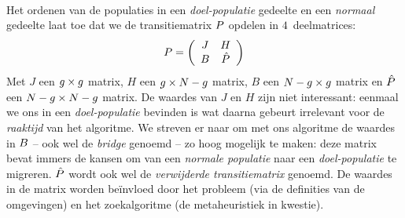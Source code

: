 \paragraph{}
Het ordenen van de populaties in een \emph{doel-populatie} gedeelte en een \emph{normaal} gedeelte laat toe dat we de transitiematrix $P$ opdelen in $4$~deelmatrices:
\begin{equation}
P=\left(\begin{array}{cc}
J&H\\
B&\hat{P}
\end{array}\right)
\end{equation}
Met $J$ een $g\times g$ matrix, $H$ een $g\times N-g$ matrix, $B$ een $N-g\times g$ matrix en $\hat{P}$ een $N-g\times N-g$ matrix. De waardes van $J$ en $H$ zijn niet interessant: eenmaal we ons in een \emph{doel-populatie} bevinden is wat daarna gebeurt irrelevant voor de \emph{raaktijd} van het algoritme. We streven er naar om met ons algoritme de waardes in $B$ -- ook wel de \emph{bridge} genoemd -- zo hoog mogelijk te maken: deze matrix bevat immers de kansen om van een \emph{normale populatie} naar een \emph{doel-populatie} te migreren. $\hat{P}$ wordt ook wel de \emph{verwijderde transitiematrix} genoemd. De waardes in de matrix worden be\"invloed door het probleem (via de definities van de omgevingen) en het zoekalgoritme (de metaheuristiek in kwestie).
